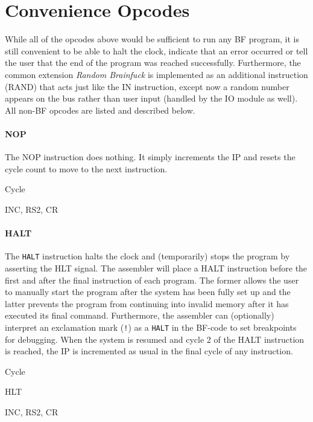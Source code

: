 \section{Convenience Opcodes} \label{sec:sequences:convenience}
While all of the opcodes above would be sufficient to run any BF program, it is still convenient to be able to halt the clock, indicate that an error occurred or tell the user that the end of the program was reached successfully. Furthermore, the common extension \emph{Random Brainfuck} \cite{esolangs-rbf} is implemented as an additional instruction (RAND) that acts just like the IN instruction, except now a random number appears on the bus rather than user input (handled by the IO module as well). All non-BF opcodes are listed and described below.

\paragraph{NOP}
The NOP instruction does nothing. It simply increments the IP and resets the cycle count to move to the next instruction.

\begin{labeledenum}{Cycle}
\item INC, RS2, CR
\end{labeledenum}

\paragraph{HALT}
The \texttt{HALT} instruction halts the clock and (temporarily) stops the program by asserting the HLT signal. The assembler will place a HALT instruction before the first and after the final instruction of each program. The former allows the user to manually start the program after the system has been fully set up and the latter prevents the program from continuing into invalid memory after it has executed its final command. Furthermore, the assembler can (optionally) interpret an exclamation mark (\texttt{!}) as a \texttt{HALT} in the BF-code to set breakpoints for debugging. When the system is resumed and cycle 2 of the HALT instruction is reached, the IP is incremented as usual in the final cycle of any instruction.

\begin{labeledenum}{Cycle}
\item HLT
\item INC, RS2, CR
\end{labeledenum}

